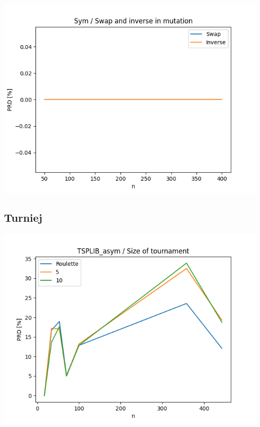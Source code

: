 \documentclass{article}
\begin{document}
\begin{center}
\includegraphics[width=\textwidth, 
                   height = 0.4\textheight, 
                   keepaspectratio]
                  {plots/sym_6_swap_inverse} 
\end{center}


\subsection{Turniej}

\begin{center}
\includegraphics[width=\textwidth, 
                   height = 0.4\textheight, 
                   keepaspectratio]
                  {plots/tsplib_asym_7_tour} 
\end{center}
\end{document}
